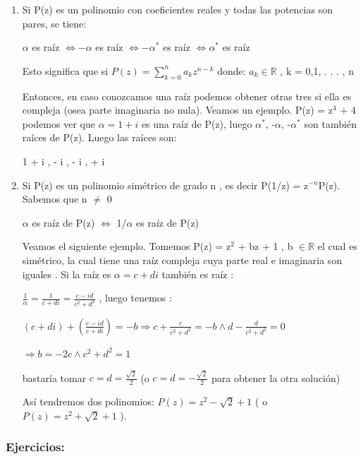 \documentclass[a4paper,12pt]{article}
\begin{document}
\begin{enumerate}
Si tenemos P(z) = iz$^4$ + 2z$^2$-i , podemos ver que $\alpha = e^{i\pi/4}$ es una raíz de P(z)

$-\alpha = e^{i5\pi/4}$, P($e^{i5\pi/4}$) = i [ $e^{i5\pi/4}$ ]$^4$ + 2[ $e^{i5\pi/4}$ ]$^2$ - i = -i + 2i - i = 0

    \item Si P(z) es un polinomio con coeficientes reales y todas las potencias son
pares, se tiene:

$\alpha$ es raíz $\Leftrightarrow -\alpha$ es raíz $\Leftrightarrow -\alpha^*$ es raíz $\Leftrightarrow \alpha^*$ es raíz

Esto significa que si $P(z) = \sum_{k=0}^n a_k z^{n-k}$ donde: $a_k \in \mathbb{R}$ , k = 0,1, . . . , n

Entonces, en caso conozcamos una raíz podemos obtener otras tres si ella es
compleja (osea parte imaginaria no nula). Veamos un ejemplo. P(z) = z$^4$ + 4
podemos ver que $\alpha = 1 + i$ es una raíz de P(z), luego $\alpha^*$, -$\alpha$, -$\alpha^*$ son también
raíces de P(z). Luego las raíces son:

1 + i \quad ,  - i \quad ,  - i \quad ,  + i

    \item Si P(z) es un polinomio simétrico de grado n , es decir P(1/z) = z$^{-n}$P(z).
   Sabemos que n $\neq$ 0
   
   $\alpha$ es raíz de P(z) $\Leftrightarrow$ 1/$\alpha$ es raíz de P(z)

Veamos el siguiente ejemplo. Tomemos P(z) = z$^2$ + bz + 1 , b $\in \mathbb{R}$ el cual es
simétrico, la cual tiene una raíz compleja cuya parte real e imaginaria son iguales .
Si la raíz es $\alpha = c + di$ también es raíz :

$\frac{1}{\alpha} = \frac{1}{c + di} = \frac{c - id}{c^2 + d^2}$ , luego tenemos :

$(c + di) + \left(\frac{c - id}{c + di}\right) = -b \Rightarrow c + \frac{c}{c^2 + d^2} = -b \wedge d - \frac{d}{c^2 + d^2} = 0$

$\Rightarrow b = -2c \wedge c^2 + d^2 = 1$

bastaría tomar $c = d = \frac{\sqrt{2}}{2}$ (o $c = d = - \frac{\sqrt{2}}{2}$ para obtener la otra solución)

Así tendremos dos polinomios: \quad $P(z) = z^2 - \sqrt{2} + 1$ ( o $P(z) = z^2 + \sqrt{2} + 1$ ).

\end{enumerate}


\subsubsection{Ejercicios:}
\end{document}
